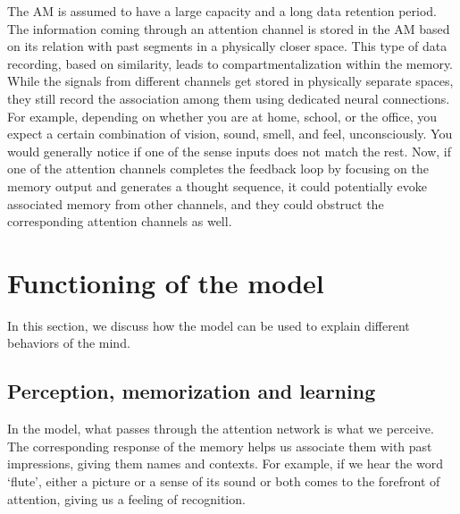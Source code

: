 \documentclass[reprint,amsmath,amssymb,apr,aip,onecolumn, 11pt]{revtex4-1}
\begin{document}
		
	The AM is assumed to have a large capacity and a long data retention period. The information coming through an attention channel is stored in the AM based on its relation with past segments in a physically closer space. This type of data recording, based on similarity, leads to compartmentalization within the memory. While the signals from different channels get stored in physically separate spaces, they still record the association among them using dedicated neural connections. For example, depending on whether you are at home, school, or the office, you expect a certain combination of vision, sound, smell, and feel, unconsciously. You would generally notice if one of the sense inputs does not match the rest. Now, if one of the attention channels completes the feedback loop by focusing on the memory output and generates a thought sequence, it could potentially evoke associated memory from other channels, and they could obstruct the corresponding attention channels as well.
	
	
		
		
		 
	
		

\section{Functioning of the model}
In this section, we discuss how the model can be used to explain different behaviors of the mind. 



\subsection{Perception, memorization and learning}

In the model, what passes through the attention network is what we perceive. The corresponding response of the memory helps us associate them with past impressions, giving them names and contexts. For example, if we hear the word `flute', either a picture or a sense of its sound or both comes to the forefront of attention, giving us a feeling of recognition. 
\end{document}
